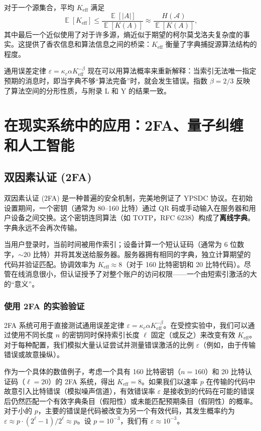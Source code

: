 \documentclass[12pt,a4paper]{article}
\theoremstyle{remark}
\newcommand{\Keff}{K_{\mathrm{eff}}}
\DeclareMathOperator{\E}{\mathbb{E}}
\begin{document}
	对于一个源集合，平均 $\Keff$ 满足
	\begin{equation}
		\E[\Keff] \le \frac{\E[|A|]}{\E[K(A)]} \approx \frac{H(\mathcal{A})}{\E[K(A)]},
	\end{equation}
	其中最后一个近似使用了对于许多源，熵近似于期望的柯尔莫戈洛夫复杂度的事实。这提供了香农信息和算法信息之间的桥梁：$\Keff$ 衡量了字典捕捉源算法结构的程度。
	
	通用误差定律 $\varepsilon = \kappa_c \alpha K_{\mathrm{eff}}^{-\beta}$ 现在可以用算法概率来重新解释：当索引无法唯一指定预期的消息时，即当字典不够“算法完备”时，就会发生错误。指数 $\beta = 2/3$ 反映了算法空间的分形性质，与附录 L 和 Y 的结果一致。
	
	\section{在现实系统中的应用：2FA、量子纠缠和人工智能}
	\label{sec:applications}
	
	\subsection{双因素认证 (2FA)}
	
	双因素认证 (2FA) 是一种普遍的安全机制，完美地例证了 YPSDC 协议。在初始设置期间，一个密钥（通常为 80–160 比特）通过 QR 码或手动输入在服务器和用户设备之间交换。这个密钥连同算法（如 TOTP，RFC 6238）构成了\textbf{离线字典}。字典永远不会再次传输。
	
	当用户登录时，当前时间被用作索引；设备计算一个短认证码（通常为 6 位数字，$\sim 20$ 比特）并将其发送给服务器。服务器拥有相同的字典，独立计算期望的代码并验证匹配。协调效率为 $\Keff \approx 8$（对于 160 比特密钥和 20 比特代码）。尽管在线消息很小，但认证授予了对整个账户的访问权限——一个由短索引激活的大的“意义”。
	
	\subsubsection{使用 2FA 的实验验证}
	\label{subsec:2fa-experiment}
	
	2FA 系统可用于直接测试通用误差定律 $\varepsilon = \kappa_c \alpha K_{\mathrm{eff}}^{-\beta}$。在受控实验中，我们可以通过使用不同长度 $n$ 的密钥同时保持索引长度 $\ell$ 固定（或反之）来改变有效 $\Keff$。对于每种配置，我们模拟大量认证尝试并测量错误激活的比例 $\varepsilon$（例如，由于传输错误或故意操纵）。
	
	作为一个具体的数值例子，考虑一个具有 160 比特密钥（$n=160$）和 20 比特认证码（$\ell=20$）的 2FA 系统，得出 $\Keff = 8$。如果我们以速率 $p$ 在传输的代码中故意引入比特错误（模拟噪声信道），有效错误率 $\varepsilon$ 是接收到的代码在可能的错误后仍然匹配一个有效字典条目（假阳性）或未能匹配预期条目（假阴性）的概率。对于小的 $p$，主要的错误是代码被改变为另一个有效代码，其发生概率约为 $\varepsilon \approx p \cdot (2^\ell -1)/2^\ell \approx p$。设 $p = 10^{-3}$，我们有 $\varepsilon \approx 10^{-3}$。
	
\end{document}
